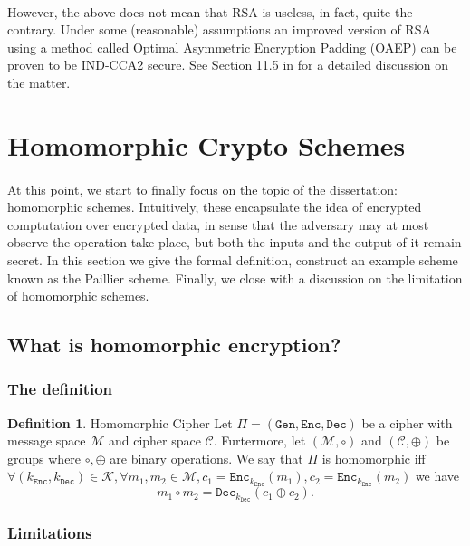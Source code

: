 \documentclass{article}
\theoremstyle{definition}
\newtheorem{definition}{Definition}[section]
\theoremstyle{example}
\newcommand{\Enc}{\texttt{Enc}}
\newcommand{\Dec}{\texttt{Dec}}
\newcommand{\Gen}{\texttt{Gen}}
\newcommand{\M}{\mathcal{M}}
\renewcommand{\C}{\mathcal{C}}
\newcommand{\K}{\mathcal{K}}
\begin{document}
\paragraph{} However, the above does not mean that RSA is useless, in fact,
quite the contrary. Under some (reasonable) assumptions an improved version of
RSA using a method called Optimal Asymmetric Encryption Padding (OAEP) can be
proven to be IND-CCA2 secure. See Section 11.5 in \cite{katz2014introduction}
for a detailed discussion on the matter.
\section{Homomorphic Crypto Schemes}
\paragraph{}
At this point, we start to finally focus on the topic of the dissertation:
homomorphic schemes. Intuitively, these encapsulate the idea of encrypted
comptutation over encrypted data, in sense that the adversary may at most
observe the operation take place, but both the inputs and the output of it
remain secret. In this section we give the formal definition, construct an
example scheme known as the Paillier scheme. Finally, we close with a discussion
on the limitation of homomorphic schemes.
\subsection{What is homomorphic encryption?}
\subsubsection{The definition}
\begin{definition}{Homomorphic Cipher}
  Let $\Pi = (\Gen, \Enc, \Dec)$ be a cipher with message space $\M$ and cipher
  space $\C$. Furtermore, let $(\M, \circ)$ and $(\C, \oplus)$ be groups where
  $\circ, \oplus$ are binary operations.
  We say that $\Pi$ is homomorphic iff $\forall (k_\Enc, k_\Dec) \in \K, \forall
  m_1, m_2 \in \M, c_1 = \Enc_{k_\Enc}(m_1), c_2 = \Enc_{k_\Enc}(m_2)$ we have
  \[
    m_1 \circ m_2 = \Dec_{k_\Dec}(c_1 \oplus c_2).
  \]
\end{definition}
\subsubsection{Limitations}
\end{document}

